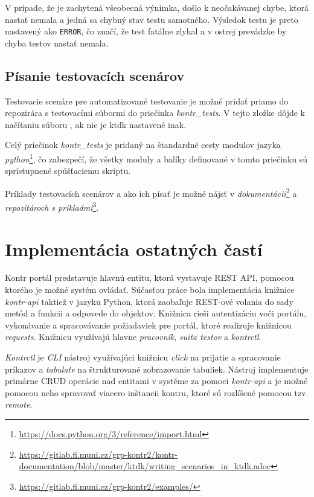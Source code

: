 \documentclass[
  digital, %
  twoside, %
  table,   %
  lof,     %
  lot,     %
]{fithesis3}
\begin{document}
V prípade, že je zachytená všeobecná výnimka, došlo k neočakávanej chybe, ktorá nastať nemala a jedná sa chybný stav testu samotného. Výsledok testu je preto nastavený ako \texttt{ERROR}, čo značí, že test fatálne zlyhal a v ostrej prevádzke by chyba testov nastať nemala. 

\subsection{Písanie testovacích scenárov}

Testovacie scenáre pre automatizované testovanie je možné pridať priamo do repozirára s testovacími súbormi do priečinka \emph{kontr\_tests}. V tejto zložke dôjde k načítaniu súboru , ak nie je ktdk nastavené inak.

Celý priečinok \emph{kontr\_tests} je pridaný na štandardné cesty modulov jazyka \emph{python}\footnote{\url{https://docs.python.org/3/reference/import.html}}, čo zabezpečí, že všetky moduly a balíky definované v tomto priečinku sú sprístupnené spúšťaciemu skriptu.

Príklady testovacích scenárov a ako ich písať je možné nájsť v \emph{dokumentácii}\footnote{\url{https://gitlab.fi.muni.cz/grp-kontr2/kontr-documentation/blob/master/ktdk/writing_scenarios_in_ktdk.adoc}} a \emph{repozitároch s príkladmi}\footnote{\url{https://gitlab.fi.muni.cz/grp-kontr2/examples/}}. 

\section{Implementácia ostatných častí}

Kontr portál predstavuje hlavnú entitu, ktorá vystavuje REST API, pomocou ktorého je možné systém ovládať. Súčasťou práce bola implementácia knižnice \emph{kontr-api} taktiež v jazyku Python, ktorá zaobaľuje REST-ové volania do sady metód a funkcii a odpovede do objektov. Knižnica rieši autentizáciu voči portálu, vykonávanie a spracovávanie požiadaviek pre portál, ktoré realizuje knižnicou \emph{requests}. 
Knižnicu využívajú hlavne \emph{pracovník}, \emph{suita testov} a \emph{kontrctl}. 

\emph{Kontrctl} je \emph{CLI} nástroj využívajúci knižnicu \emph{click} na prijatie a spracovanie príkazov a \emph{tabulate} na štrukturované zobrazovanie tabuliek. Nástroj implementuje primárne CRUD operácie nad entitami v systéme za pomoci \emph{kontr-api} a je možné pomocou neho spravovať viacero inštancii kontru, ktoré sú rozlíšené pomocou tzv. \emph{remote}. 
\end{document}
